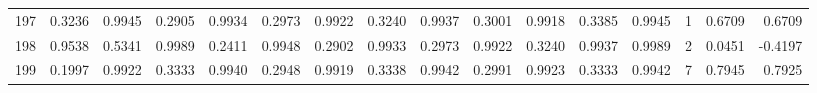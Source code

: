 \begin{tabular}{lrrrrrrrrrrrrrrr}
197 &      0.3236 &  0.9945 &  0.2905 &  0.9934 &  0.2973 &  0.9922 &  0.3240 &  0.9937 &  0.3001 &  0.9918 &   0.3385 &     0.9945 &      1 &                    0.6709 &                     0.6709 \\
198 &      0.9538 &  0.5341 &  0.9989 &  0.2411 &  0.9948 &  0.2902 &  0.9933 &  0.2973 &  0.9922 &  0.3240 &   0.9937 &     0.9989 &      2 &                    0.0451 &                    -0.4197 \\
199 &      0.1997 &  0.9922 &  0.3333 &  0.9940 &  0.2948 &  0.9919 &  0.3338 &  0.9942 &  0.2991 &  0.9923 &   0.3333 &     0.9942 &      7 &                    0.7945 &                     0.7925 \\
\bottomrule
\end{tabular}
